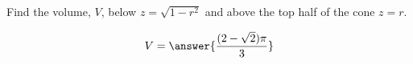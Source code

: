 \documentclass{ximera}
\author{David Guichard \and Neal Koblitz \and H. Jerome Keisler \and Albert Scheller \and Barry Balof \and Mike Wills \and Matthew Carr}
\begin{document}
\begin{exercise}





Find the volume, $V$, below $z=\sqrt{1-r^2}$ and above the top half of the cone $z=r$.
\begin{prompt}
\[
V=\answer{\frac{(2-\sqrt{2})\pi}{3}}
\]
\end{prompt}



\end{exercise}
\end{document}
